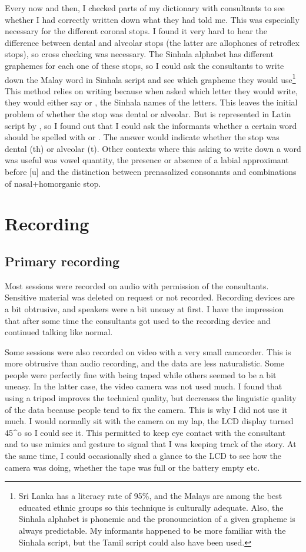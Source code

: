 Every now and then, I checked parts of my dictionary with consultants to see whether I had correctly written down what they had told me. This was especially necessary for the different coronal stops. I found it very hard to hear the difference between dental and alveolar stops (the latter are allophones of retroflex stops), so cross checking was necessary. The Sinhala alphabet has different graphemes for each one of these stops, so I could ask the consultants to write down the Malay word in Sinhala script and see which grapheme they would use\footnote{Sri Lanka has a literacy rate of 95\%, and the Malays are among the best educated ethnic groups so this technique is culturally adequate. Also, the Sinhala alphabet is phonemic and the pronounciation of a given grapheme is always predictable. My informants happened to be more familiar with the Sinhala script, but the Tamil script could also have been used.} 
This method relies on writing because when asked which letter they would write, they would either say  or , the Sinhala names of the letters. This leaves the initial problem of whether the stop was dental or alveolar. But  is represented in Latin script by , so I found out that I could ask the informants whether a certain word should be spelled with  or . The answer would indicate whether the stop was dental (th) or alveolar (t).
Other contexts where this asking to write down a word was useful was vowel quantity, the presence or absence of a labial approximant before [u] and the distinction between prenasalized consonants and combinations of nasal+homorganic stop.

\section{Recording}
\subsection{Primary recording}
Most sessions were recorded on audio with permission of the consultants. Sensitive material was deleted on request or not recorded. Recording devices are a bit obtrusive, and speakers were a bit uneasy at first. I have the impression that after some time the consultants got used to the recording device and continued talking like normal.

Some sessions were also recorded on video with a very small camcorder. This is more obtrusive than audio recording, and the data are less naturalistic. Some people were perfectly fine with being taped while others seemed to be a bit uneasy. In the latter case, the video camera was not used much. I found that using a tripod improves the technical quality, but decreases the linguistic quality of the data because people tend to fix the camera. This is why I did not use it much. I would normally sit with the camera on my lap, the LCD display turned 45^{o} so I could see it. This permitted to keep eye contact with the consultant and to use mimics and gesture to signal that I was keeping track of the story. At the same time, I could occasionally shed a glance to the LCD to see how the camera was doing, whether the tape was full or the battery empty etc.


